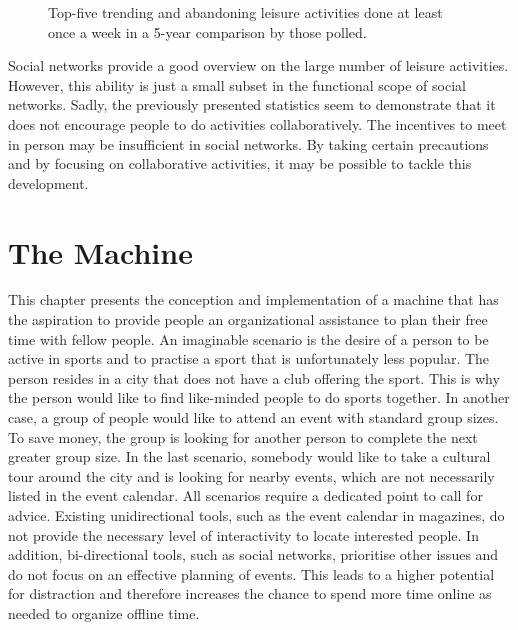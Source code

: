 \documentclass[12pt,numbers=noenddot,parskip,bibliography=totocnumbered,listof=totocnumbered,draft]{scrreprt}
\begin{document}
\begin{figure}
\caption[Trending and abonding leisure activites]{Top-five trending and abandoning leisure activities done at least once a week in a 5-year comparison by those polled. \citep{freizeitmonitor2016}}
\label{topfivechangingleisureactivities}
\end{figure}

Social networks provide a good overview on the large number of leisure activities. However, this ability is just a small subset in the functional scope of social networks. Sadly, the previously presented statistics seem to demonstrate that it does not encourage people to do activities collaboratively. The incentives to meet in person may be insufficient in social networks. By taking certain precautions and by focusing on collaborative activities, it may be possible to tackle this development.

\chapter{The Machine}
This chapter presents the conception and implementation of a machine that has the aspiration to provide people an organizational assistance to plan their free time with fellow people. An imaginable scenario is the desire of a person to be active in sports and to practise a sport that is unfortunately less popular. The person resides in a city that does not have a club offering the sport. This is why the person would like to find like-minded people to do sports together. In another case, a group of people would like to attend an event with standard group sizes. To save money, the group is looking for another person to complete the next greater group size. In the last scenario, somebody would like to take a cultural tour around the city and is looking for nearby events, which are not necessarily listed in the event calendar. All scenarios require a dedicated point to call for advice. Existing unidirectional tools, such as the event calendar in magazines, do not provide the necessary level of interactivity to locate interested people. In addition, bi-directional tools, such as social networks, prioritise other issues and do not focus on an effective planning of events. This leads to a higher potential for distraction and therefore increases the chance to spend more time online as needed to organize offline time.
\end{document}
